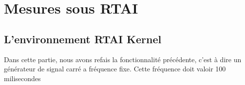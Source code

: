 \section{Mesures sous RTAI}
\subsection{L'environnement RTAI Kernel}
Dans cette partie, nous avons refais la fonctionnalité précédente, c'est à dire un générateur de signal carré a fréquence fixe. Cette fréquence doit valoir 100 milisecondes 